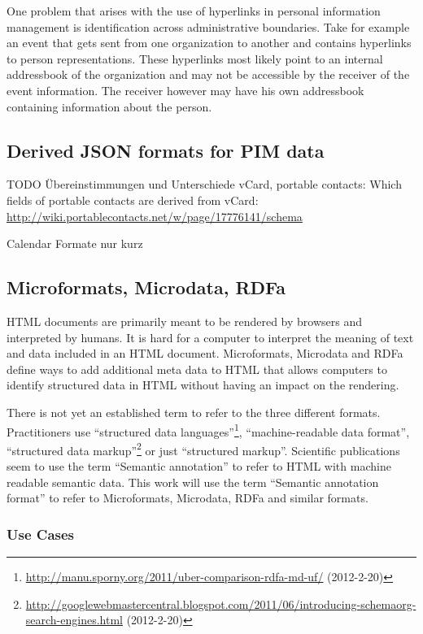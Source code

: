 \documentclass[12pt,a4paper]{scrartcl}		%
\newcommand{\citeurl}[2]{\url{#1} (#2)}
\begin{document}
One problem that arises with the use of hyperlinks in personal information
management is identification across administrative boundaries. Take for example
an event that gets sent from one organization to another and contains hyperlinks
to person representations. These hyperlinks most likely point to an internal
addressbook of the organization and may not be accessible by the receiver of the
event information. The receiver however may have his own addressbook containing
information about the person.

\subsection{Derived JSON formats for PIM data}

TODO Übereinstimmungen und Unterschiede vCard, portable contacts: Which fields of portable contacts are derived from vCard: \url{http://wiki.portablecontacts.net/w/page/17776141/schema}

Calendar Formate nur kurz

\subsection{Microformats, Microdata, RDFa}
\label{sec:microdata}

HTML documents are primarily meant to be rendered by browsers and interpreted by
humans. It is hard for a computer to interpret the meaning of text and data
included in an HTML document. Microformats, Microdata and RDFa define ways to
add additional meta data to HTML that allows computers to identify structured
data in HTML without having an impact on the rendering.\cite{Tennison2012}

There is not yet an established term to refer to the three different
formats. Practitioners use ``structured data
languages''\footnote{\citeurl{http://manu.sporny.org/2011/uber-comparison-rdfa-md-uf/}{2012-2-20}},
``machine-readable data format''\cite{Hickson2011}, ``structured data
markup''\footnote{\citeurl{http://googlewebmastercentral.blogspot.com/2011/06/introducing-schemaorg-search-engines.html}{2012-2-20}}
or just ``structured markup''. Scientific publications seem to use the term
``Semantic annotation''\cite{instance7} to refer to HTML with machine readable
semantic data. This work will use the term ``Semantic annotation format'' to
refer to Microformats, Microdata, RDFa and similar formats.

\subsubsection{Use Cases}
\end{document}
